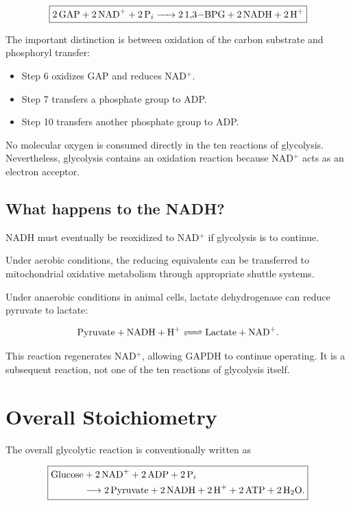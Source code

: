 \documentclass[11pt,a4paper]{article}
\begin{document}
\[
\boxed{
\ce{2 GAP + 2 NAD+ + 2 P_i
-> 2 1,3-BPG + 2 NADH + 2 H+}
}
\]

The important distinction is between oxidation of the carbon
substrate and phosphoryl transfer:

\begin{itemize}
  \item Step 6 oxidizes GAP and reduces NAD$^+$.
  \item Step 7 transfers a phosphate group to ADP.
  \item Step 10 transfers another phosphate group to ADP.
\end{itemize}

No molecular oxygen is consumed directly in the ten reactions
of glycolysis. Nevertheless, glycolysis contains an oxidation
reaction because NAD$^+$ acts as an electron acceptor.

\subsection{What happens to the NADH?}

NADH must eventually be reoxidized to NAD$^+$ if glycolysis
is to continue.

Under aerobic conditions, the reducing equivalents can be
transferred to mitochondrial oxidative metabolism through
appropriate shuttle systems.

Under anaerobic conditions in animal cells, lactate dehydrogenase
can reduce pyruvate to lactate:

\[
\ce{Pyruvate + NADH + H+ <=> Lactate + NAD+}.
\]

This reaction regenerates NAD$^+$, allowing GAPDH to continue
operating. It is a subsequent reaction, not one of the ten
reactions of glycolysis itself.

\section{Overall Stoichiometry}
\label{sec:overall}

The overall glycolytic reaction is conventionally written as

\[
\boxed{
\begin{aligned}
\ce{Glucose}
&+\ce{2 NAD+}
+\ce{2 ADP}
+\ce{2 P_i}\\
&\longrightarrow
\ce{2 Pyruvate}
+\ce{2 NADH}
+\ce{2 H+}
+\ce{2 ATP}
+\ce{2 H2O}.
\end{aligned}
}
\]
\end{document}
